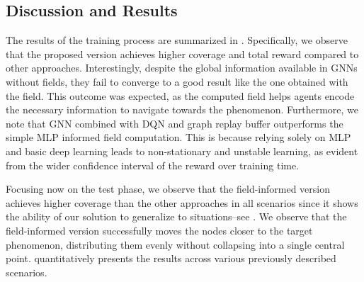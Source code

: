 \documentclass[conference]{IEEEtran}
\begin{document}
\subsection{Discussion and Results}
The results of the training process are summarized in . 
%
Specifically, we observe that the proposed version achieves higher coverage and total reward compared to other approaches. 
%
Interestingly, despite the global information available in \acp{GNN} without fields, they fail to converge to a good result like the one obtained with the field. 
%
This outcome was expected, as the computed field helps agents encode the necessary information to navigate towards the phenomenon.
%
Furthermore, we note that \ac{GNN} combined with \ac{DQN} and graph replay buffer outperforms the simple \ac{MLP} informed field computation. 
%
This is because relying solely on \ac{MLP} and basic deep learning leads to non-stationary and unstable learning, 
 as evident from the wider confidence interval of the reward over training time.

Focusing now on the test phase, %
 we observe that the field-informed version achieves higher coverage than the other approaches in all scenarios since it shows the ability of our solution to generalize to situations--see . 
% 
We observe that the field-informed version successfully moves the nodes closer to the target phenomenon, 
 distributing them evenly without collapsing into a single central point. 
  quantitatively presents the results across various previously described scenarios.
\end{document}
